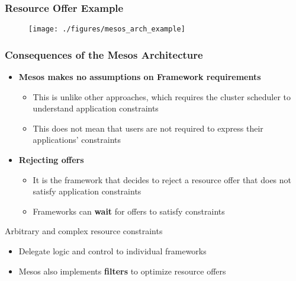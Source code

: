 \begin{frame}
\frametitle{Resource Offer Example}
\begin{figure}[h]
  \centering
  \texttt{[image: ./figures/mesos\_arch\_example]}
  \label{fig:mesos_arch_example}
\end{figure}
\end{frame}

\begin{frame}
\frametitle{Consequences of the Mesos Architecture}
\begin{itemize}
	\item {\bf Mesos makes no assumptions on Framework requirements}
	\begin{itemize}
		\item This is unlike other approaches, which requires the cluster scheduler to understand application constraints
		\item This does not mean that users are not required to express their applications' constraints
	\end{itemize}

	\item {\bf Rejecting offers}
	\begin{itemize}
		\item It is the framework that decides to reject a resource offer that does not satisfy application constraints
		\item Frameworks can {\bf wait} for offers to satisfy constraints
	\end{itemize}
\end{itemize}

\begin{block}{Arbitrary and complex resource constraints}
\begin{itemize}
	\item Delegate logic and control to individual frameworks
	\item Mesos also implements {\bf filters} to optimize resource offers
\end{itemize}
\end{block}
\end{frame}

